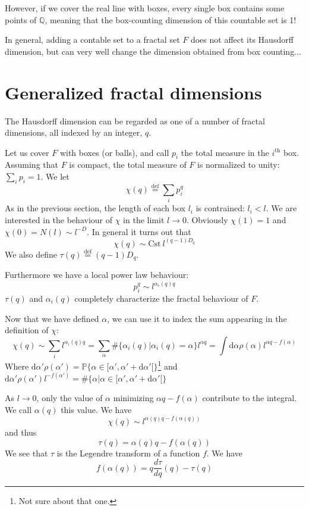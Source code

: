 \documentclass[11pt]{article}
\newcommand{\define}{\ensuremath{ \overset{\text{def}}{=} }}
\renewcommand{\d}[1]{\mathrm{d}#1}
\begin{document}
However, if we cover the real line with boxes, every single box contains some points of $\mathbb{Q}$, meaning that the box-counting dimension of this countable set is 1!

In general, adding a contable set to a fractal set $F$ does not affect its Hausdorff dimension, but can very well change the dimension obtained from box counting...

\section{Generalized fractal dimensions}
The Hausdorff dimension can be regarded as one of a number of fractal dimensions, all indexed by an integer, $q$.

Let us cover $F$ with boxes (or balls), and call $p_i$ the total measure in the $i^{\text{th}}$ box. Assuming that $F$ is compact, the total measure of $F$ is normalized to unity: $\sum_i p_i = 1$.
We let
\begin{equation}
	\chi(q) \define \sum_i p_i^q
\end{equation}
As in the previous section, the length of each box $l_i$ is contrained: $l_i < l$. We are interested in the behaviour of $\chi$ in the limit $l \rightarrow 0$.
Obviously $\chi(1) = 1$ and $\chi(0) = N(l) \sim l^{-D}$. In general it turns out that
\begin{equation}
\boxed{
	\chi(q) \sim \text{Cst}~l^{(q-1)D_q}
}
\end{equation}
We also define $\tau(q) \define (q-1) D_q$.

Furthermore we have a local power law behaviour:
\begin{equation}
\boxed{
	p_i^q \sim l^{\alpha_i(q) q}
}
\end{equation}
$\tau(q)$ and $\alpha_i(q)$ completely characterize the fractal behaviour of $F$.

Now that we have defined $\alpha$, we can use it to index the sum appearing in the definition of $\chi$:
\begin{equation}
	\chi(q) \sim \sum_i l^{\alpha_i(q)q} = \sum_\alpha \# \{ \alpha_i(q) | \alpha_i(q) = \alpha\} l^{\alpha q} = \int \d{\alpha} \rho(\alpha) l^{\alpha q - f(\alpha)}
\end{equation}
Where $\d{\alpha'}\rho(\alpha') = \mathbb{P}\{ \alpha \in [\alpha', \alpha' + \d{\alpha'}[ \}$\footnote{Not sure about that one.} and  $\d{\alpha'}\rho(\alpha')l^{-f(\alpha')} = \#\{ \alpha | \alpha \in [\alpha', \alpha' + \d{\alpha'}[  \}$

As $l \rightarrow 0$, only the value of $\alpha$ minimizing $\alpha q - f(\alpha)$ contribute to the integral. We call $\alpha(q)$ this value. We have
\begin{equation}
	\chi(q) \sim l^{\alpha(q) q - f(\alpha(q))}
\end{equation}
and thus
\begin{equation}
\boxed{
	\tau(q) = \alpha(q) q - f(\alpha(q))
}
\end{equation}
We see that $\tau$ is the Legendre transform of a function $f$. We have
\begin{equation}
\boxed{
	f(\alpha(q)) = q \frac{d \tau}{d q}(q) - \tau(q)
}
\end{equation}
\end{document}
